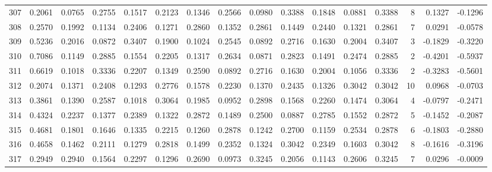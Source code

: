 \begin{tabular}{lrrrrrrrrrrrrrrr}
307 &      0.2061 &  0.0765 &  0.2755 &  0.1517 &  0.2123 &  0.1346 &  0.2566 &  0.0980 &  0.3388 &  0.1848 &   0.0881 &     0.3388 &      8 &                    0.1327 &                    -0.1296 \\
308 &      0.2570 &  0.1992 &  0.1134 &  0.2406 &  0.1271 &  0.2860 &  0.1352 &  0.2861 &  0.1449 &  0.2440 &   0.1321 &     0.2861 &      7 &                    0.0291 &                    -0.0578 \\
309 &      0.5236 &  0.2016 &  0.0872 &  0.3407 &  0.1900 &  0.1024 &  0.2545 &  0.0892 &  0.2716 &  0.1630 &   0.2004 &     0.3407 &      3 &                   -0.1829 &                    -0.3220 \\
310 &      0.7086 &  0.1149 &  0.2885 &  0.1554 &  0.2205 &  0.1317 &  0.2634 &  0.0871 &  0.2823 &  0.1491 &   0.2474 &     0.2885 &      2 &                   -0.4201 &                    -0.5937 \\
311 &      0.6619 &  0.1018 &  0.3336 &  0.2207 &  0.1349 &  0.2590 &  0.0892 &  0.2716 &  0.1630 &  0.2004 &   0.1056 &     0.3336 &      2 &                   -0.3283 &                    -0.5601 \\
312 &      0.2074 &  0.1371 &  0.2408 &  0.1293 &  0.2776 &  0.1578 &  0.2230 &  0.1370 &  0.2435 &  0.1326 &   0.3042 &     0.3042 &     10 &                    0.0968 &                    -0.0703 \\
313 &      0.3861 &  0.1390 &  0.2587 &  0.1018 &  0.3064 &  0.1985 &  0.0952 &  0.2898 &  0.1568 &  0.2260 &   0.1474 &     0.3064 &      4 &                   -0.0797 &                    -0.2471 \\
314 &      0.4324 &  0.2237 &  0.1377 &  0.2389 &  0.1322 &  0.2872 &  0.1489 &  0.2500 &  0.0887 &  0.2785 &   0.1552 &     0.2872 &      5 &                   -0.1452 &                    -0.2087 \\
315 &      0.4681 &  0.1801 &  0.1646 &  0.1335 &  0.2215 &  0.1260 &  0.2878 &  0.1242 &  0.2700 &  0.1159 &   0.2534 &     0.2878 &      6 &                   -0.1803 &                    -0.2880 \\
316 &      0.4658 &  0.1462 &  0.2111 &  0.1279 &  0.2818 &  0.1499 &  0.2352 &  0.1324 &  0.3042 &  0.2349 &   0.1603 &     0.3042 &      8 &                   -0.1616 &                    -0.3196 \\
317 &      0.2949 &  0.2940 &  0.1564 &  0.2297 &  0.1296 &  0.2690 &  0.0973 &  0.3245 &  0.2056 &  0.1143 &   0.2606 &     0.3245 &      7 &                    0.0296 &                    -0.0009 \\

\end{tabular}
